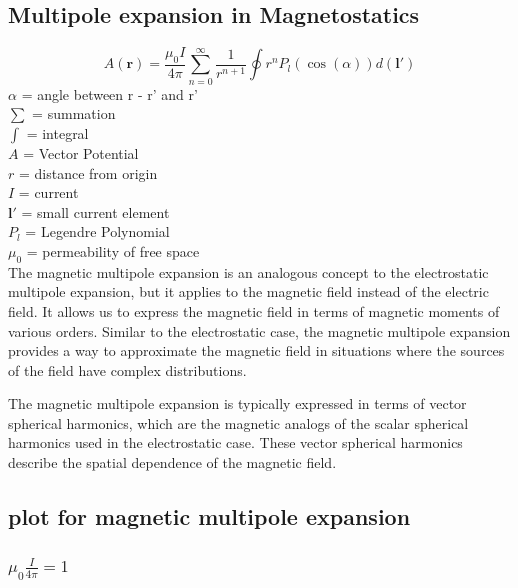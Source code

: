 \documentclass[12pt,a4paper]{article}
\begin{document}
\subsection{Multipole expansion in Magnetostatics}
\begin{equation}
A(\mathbf{r}) = \frac{\mu_0I}{4\pi} \sum_{n=0}^{\infty} \frac{1}{r^{n+1}} \oint r^{n} P_l(\cos(\alpha))d(\mathbf{l}') 
\end{equation}
$\alpha$ = angle between r - r' and r'\\
$\sum$ = summation\\
$\int$ = integral\\
$A$ = Vector Potential\\
$r$ = distance from origin \\
$I$ = current\\
$\mathbf{l}'$ = small current element\\
$P_l$ = Legendre Polynomial \\
$\mu_0$ = permeability of free space\\
The magnetic multipole expansion is an analogous concept to the electrostatic multipole expansion, but it applies to the magnetic field instead of the electric field. It allows us to express the magnetic field in terms of magnetic moments of various orders. Similar to the electrostatic case, the magnetic multipole expansion provides a way to approximate the magnetic field in situations where the sources of the field have complex distributions.

The magnetic multipole expansion is typically expressed in terms of vector spherical harmonics, which are the magnetic analogs of the scalar spherical harmonics used in the electrostatic case. These vector spherical harmonics describe the spatial dependence of the magnetic field.~\cite{DGE}

\subsection{plot for magnetic multipole expansion}
\subsubsection{$\mu_0\frac{I}{4\pi} = 1$}
\end{document}
